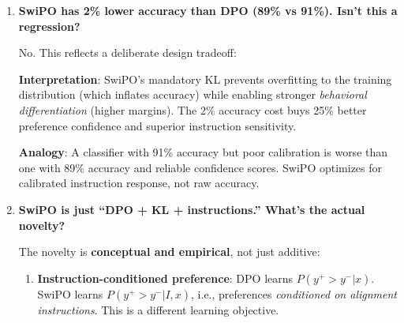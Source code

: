 \begin{enumerate}[label=\textbf{Q\arabic*.}, leftmargin=*, itemsep=8pt]
\vspace{4mm}

\item \textbf{SwiPO has 2\% lower accuracy than DPO (89\% vs 91\%). Isn't this a regression?}

 No. This reflects a deliberate design tradeoff:

\begin{table}[ht!]
\centering
\normalsize
\renewcommand{\arraystretch}{1.2}
\caption{Accuracy vs reward margin tradeoff between DPO and SwiPO.}
\label{tab:faq_accuracy_tradeoff}
\end{table}

\textbf{Interpretation}: SwiPO's mandatory KL prevents overfitting to the training distribution (which inflates accuracy) while enabling stronger \textit{behavioral differentiation} (higher margins). The 2\% accuracy cost buys 25\% better preference confidence and superior instruction sensitivity.

\textbf{Analogy}: A classifier with 91\% accuracy but poor calibration is worse than one with 89\% accuracy and reliable confidence scores. SwiPO optimizes for calibrated instruction response, not raw accuracy.

\vspace{4mm}

\item \textbf{SwiPO is just ``DPO + KL + instructions.'' What's the actual novelty?}

 The novelty is \textbf{conceptual and empirical}, not just additive:

\begin{enumerate}[leftmargin=*,itemsep=2pt]
    \item \textbf{Instruction-conditioned preference}: DPO learns $P(y^+ > y^- | x)$. SwiPO learns $P(y^+ > y^- | I, x)$, i.e., preferences \textit{conditioned on alignment instructions}. This is a different learning objective.


\end{enumerate}
\end{enumerate}
